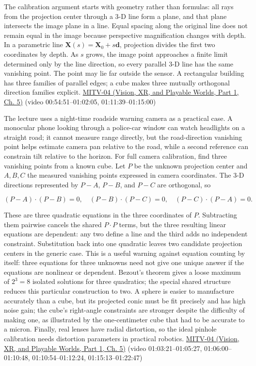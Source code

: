 The calibration argument starts with geometry rather than formulas: all rays from the projection center through a 3-D line form a plane, and that plane intersects the image plane in a line. Equal spacing along the original line does not remain equal in the image because perspective magnification changes with depth. In a parametric line \(\mathbf{X}(s)=\mathbf{X}_0+s\mathbf{d}\), projection divides the first two coordinates by depth. As \(s\) grows, the image point approaches a finite limit determined only by the line direction, so every parallel 3-D line has the same vanishing point. The point may lie far outside the sensor. A rectangular building has three families of parallel edges; a cube makes three mutually orthogonal direction families explicit. \href{../07-Vision-XR-and-Playable-Worlds-P01/main.pdf\#nameddest=04-visual-computing-ii-ch036-mitv-04---fixed-optical-flow-optical-mouse-constant-brightness-assumption-closed-form-solution}{MITV-04 (Vision, XR, and Playable Worlds, Part 1, Ch. 5)} (video 00:54:51--01:02:05, 01:11:39--01:15:00)

The lecture uses a night-time roadside warning camera as a practical case. A monocular phone looking through a police-car window can watch headlights on a straight road; it cannot measure range directly, but the road-direction vanishing point helps estimate camera pan relative to the road, while a second reference can constrain tilt relative to the horizon. For full camera calibration, find three vanishing points from a known cube. Let \(P\) be the unknown projection center and \(A,B,C\) the measured vanishing points expressed in camera coordinates. The 3-D directions represented by \(P-A\), \(P-B\), and \(P-C\) are orthogonal, so

\[
(P-A)\cdot(P-B)=0,\quad (P-B)\cdot(P-C)=0,\quad (P-C)\cdot(P-A)=0.
\]

These are three quadratic equations in the three coordinates of \(P\). Subtracting them pairwise cancels the shared \(P\cdot P\) terms, but the three resulting linear equations are dependent: any two define a line and the third adds no independent constraint. Substitution back into one quadratic leaves two candidate projection centers in the generic case. This is a useful warning against equation counting by itself: three equations for three unknowns need not give one unique answer if the equations are nonlinear or dependent. Bezout's theorem gives a loose maximum of \(2^3=8\) isolated solutions for three quadratics; the special shared structure reduces this particular construction to two. A sphere is easier to manufacture accurately than a cube, but its projected conic must be fit precisely and has high noise gain; the cube's right-angle constraints are stronger despite the difficulty of making one, as illustrated by the one-centimeter cube that had to be accurate to a micron. Finally, real lenses have radial distortion, so the ideal pinhole calibration needs distortion parameters in practical robotics. \href{../07-Vision-XR-and-Playable-Worlds-P01/main.pdf\#nameddest=04-visual-computing-ii-ch036-mitv-04---fixed-optical-flow-optical-mouse-constant-brightness-assumption-closed-form-solution}{MITV-04 (Vision, XR, and Playable Worlds, Part 1, Ch. 5)} (video 01:03:21--01:05:27, 01:06:00--01:10:48, 01:10:54--01:12:24, 01:15:13--01:22:47)

